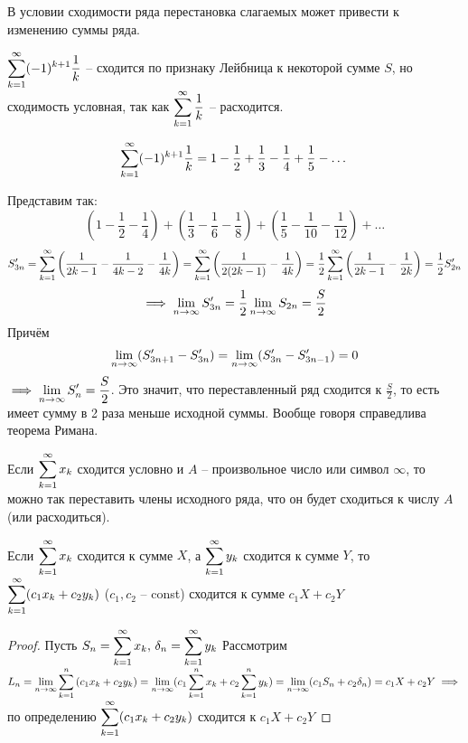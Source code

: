 \begin{remark}
    В условии сходимости ряда перестановка слагаемых может привести к
    изменению суммы ряда.

    $\displaystyle\sum_{k=1}^\infty (-1)^{k + 1} \frac{1}{k}$ -- сходится по признаку Лейбница к 
    некоторой сумме $S$, но сходимость условная, так как
    $\displaystyle\sum_{k=1}^\infty \frac{1}{k}$ -- расходится.

    \[ \displaystyle\sum_{k=1}^\infty (-1)^{k + 1} \frac{1}{k} 
    = 1 - \frac{1}{2} + \frac{1}{3} - \frac{1}{4} + \frac{1}{5} - \dots \]

    Представим так: 
    \[ 
        \left( 1 - \frac{1}{2} - \frac{1}{4} \right)
        + \left( \frac{1}{3} - \frac{1}{6} - \frac{1}{8} \right)
        + \left( \frac{1}{5} - \frac{1}{10} - \frac{1}{12} \right)
        + \dots
    \]
    \[
        S_{3n}' 
        = \displaystyle\sum_{k=1}^\infty \left( \frac{1}{2k - 1} - \frac{1}{4k-2} - \frac{1}{4k} \right)
        = \displaystyle\sum_{k=1}^\infty \left( \frac{1}{2 (2k - 1)} - \frac{1}{4k} \right)
        = \frac{1}{2} \displaystyle\sum_{k=1}^\infty \left( \frac{1}{2k - 1} - \frac{1}{2k} \right)
        = \frac{1}{2} S_{2n}'
    \]
    \[ \implies \displaystyle\lim_{n \to \infty} S_{3n}' = \frac{1}{2} \displaystyle\lim_{n \to \infty} S_{2n} = \frac{S}{2} \]
    Причём
    \[ \displaystyle\lim_{n \to \infty} (S_{3n + 1}' - S_{3n}') = \displaystyle\lim_{n \to \infty} (S_{3n}' - S_{3n - 1}') = 0 \]
    $\implies \displaystyle\lim_{n \to \infty} S_n' = \frac{S}{2}$. Это значит, что переставленный ряд
    сходится к $\frac{S}{2}$, то есть имеет сумму в 2 раза меньше исходной
    суммы. Вообще говоря справедлива теорема Римана.
\end{remark}

\begin{theorem}[Римана]
    Если $\displaystyle\sum_{k=1}^\infty x_k$ сходится условно и $A$ -- произвольное число или символ
    $\infty$, то можно так переставить члены исходного ряда, что он будет
    сходиться к числу $A$ (или расходиться).
\end{theorem}

\begin{theorem}
    Если $\displaystyle\sum_{k=1}^\infty x_k$ сходится к сумме $X$, а $\displaystyle\sum_{k=1}^\infty y_k$ сходится к сумме $Y$,
    то $\displaystyle\sum_{k=1}^\infty (c_1 x_k + c_2 y_k)$ ($c_1, c_2$ -- const) сходится к сумме
    $c_1 X + c_2 Y$
\end{theorem}
\begin{proof}
    Пусть $S_n = \displaystyle\sum_{k=1}^\infty x_k, \, \delta_n = \displaystyle\sum_{k=1}^\infty y_k$
    Рассмотрим $L_n = \displaystyle\lim_{n \to \infty} \displaystyle\sum_{k=1}^n {(c_1 x_k + c_2 y_k)} 
    = \displaystyle\lim_{n \to \infty} (c_1 \displaystyle\sum_{k=1}^n x_k + c_2 \displaystyle\sum_{k=1}^n y_k)
    = \displaystyle\lim_{n \to \infty} (c_1 S_n + c_2 \delta_n)
    = c_1 X + c_2 Y \implies$ по определению $\displaystyle\sum_{k=1}^\infty (c_1 x_k + c_2 y_k)$
    сходится к $c_1 X + c_2 Y$
\end{proof}

